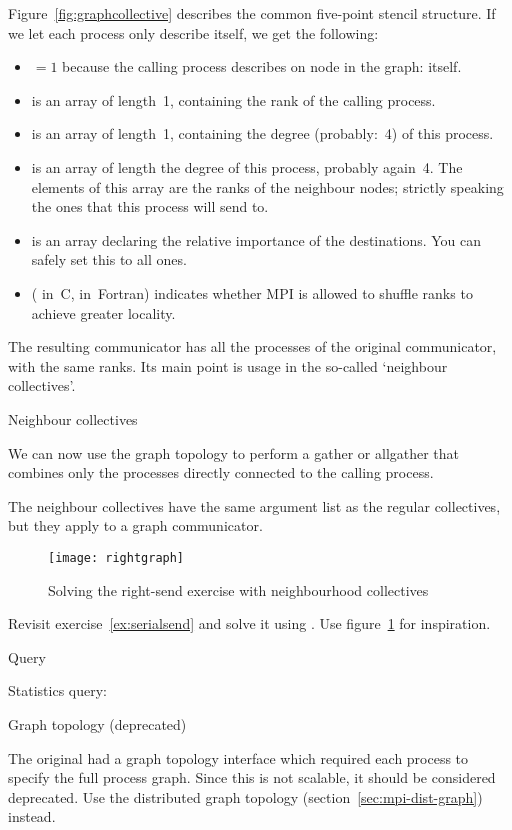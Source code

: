 
Figure~\ref{fig:graphcollective} describes the common five-point
stencil structure. If we let each process only describe itself, we get
the following:
\begin{itemize}
\item {}$=1$ because the calling process describes on node
  in the graph: itself.
\item {} is an array of length~1, containing the rank of the
  calling process.
\item {} is an array of length~1, containing the degree
  (probably:~4) of this process.
\item {} is an array of length the degree of this
  process, probably again~4. The elements of this array are the ranks
  of the neighbour nodes; strictly speaking the ones that this process
  will send to.
\item {} is an array declaring the relative importance of the
  destinations. You can safely set this to all ones.
\item {} ( in~C,  in~Fortran) indicates
  whether MPI is allowed to shuffle ranks to achieve greater locality.
\end{itemize}

The resulting communicator has all the processes of the original
communicator, with the same ranks. Its main point is usage in the
so-called `neighbour collectives'.

 {Neighbour collectives}

We can now use the graph topology to perform a gather or allgather
that combines only the processes directly connected to the calling
process.


The neighbour collectives have the same argument list as the regular
collectives, but they apply to a graph communicator.

\begin{figure}[ht]
  \texttt{[image: rightgraph]}
  \caption{Solving the right-send exercise with neighbourhood
    collectives}
  \label{fig:rightgraph}
\end{figure}

\begin{exercise}
  \label{ex:rightgraph}
  Revisit exercise~\ref{ex:serialsend} and solve it using
  . Use figure~\ref{fig:rightgraph} for inspiration.
\end{exercise}

 {Query}

Statistics query:
%

 {Graph topology (deprecated)}
\label{sec:mpi-1-graph}

The original  had a graph topology interface
which required each process to specify the full process graph. Since
this is not scalable, it should be considered deprecated. Use the
distributed graph topology (section~\ref{sec:mpi-dist-graph}) instead.


